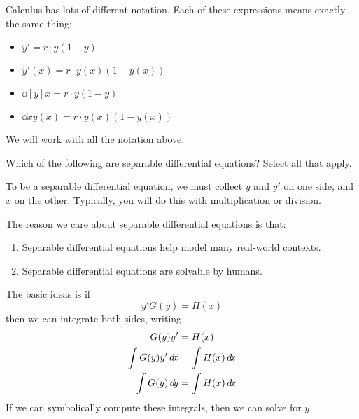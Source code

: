 \documentclass{ximera}
\begin{document}
\begin{warning}
  Calculus has lots of different notation. Each of these expressions
  means exactly the same thing:
  \begin{itemize}
  \item $y' = r\cdot y(1-y)$
  \item $y'(x) = r\cdot y(x)(1-y(x))$
  \item $\dd[y]{x} = r \cdot y(1-y)$
  \item $\dd{x} y(x) = r\cdot y(x) (1-y(x))$
  \end{itemize}
  We will work with all the notation above.
\end{warning}

\begin{question}
  Which of the following are separable differential equations?  Select all that apply.
  \begin{selectAll}
  \end{selectAll}
  \begin{hint}
    To be a separable differential equation, we must collect $y$ and
    $y'$ on one side, and $x$ on the other. Typically, you will do
    this with multiplication or division.
  \end{hint}
\end{question}

The reason we care about separable differential equations is that:
\begin{enumerate}
\item Separable differential equations help model many real-world contexts.
\item Separable differential equations are solvable by humans.
\end{enumerate}
The basic ideas is if
\[
y'G(y) = H(x)
\]
then we can integrate both sides, writing
\begin{align*}
  G(y)y'  &= H(x)\\
  \int G(y) y' \d x &= \int H(x) \d x\\
  \int G(y) \d y &= \int H(x) \d x
\end{align*}
If we can symbolically compute these integrals, then we can solve for
$y$.
\end{document}
